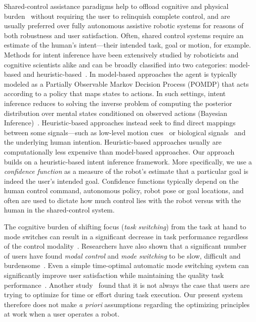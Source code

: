 \documentclass[conference]{IEEEtran}
\begin{document}
Shared-control assistance paradigms help to offload cognitive and physical burden~\cite{volosyak2005rehabilitation} without requiring the user to relinquish complete control, and are usually preferred over fully autonomous assistive robotic systems for reasons of both robustness and user satisfaction. Often, shared control systems require an estimate of the human's intent---their intended task, goal or motion, for example. Methods for intent inference have been extensively studied by roboticists and cognitive scientists alike and can be broadly classified into two categories: model-based and heuristic-based~\cite{baker2017rational}. In model-based approaches the agent is typically modeled as a Partially Observable Markov Decision Process (POMDP) that acts according to a policy that maps states to actions. In such settings, intent inference reduces to solving the inverse problem of computing the posterior distribution over mental states conditioned on observed actions (Bayesian Inference)~\cite{baker2007goal,baker2009action}. Heuristic-based approaches instead seek to find direct mappings between some signals---such as low-level motion cues~\cite{barrett2005accurate} or biological signals~\cite{donoghue2002connecting} and the underlying human intention. Heuristic-based approaches usually are computationally less expensive than model-based approaches. Our approach builds on a heuristic-based intent inference framework. More specifically, we use a \textit{confidence function} as a measure of the robot's estimate that a particular goal is indeed the user's intended goal. Confidence functions typically depend on the human control command, autonomous policy, robot pose or goal locations, and often are used to dictate how much control lies with the robot versus with the human in the shared-control system. 

The cognitive burden of shifting focus (\textit{task switching}) from the task at hand to mode switches can result in a significant decrease in task performance regardless of the control modality~\cite{monsell2003task}. Researchers have also shown that a significant number of users have found \textit{modal control} and \textit{mode switching} to be slow, difficult and burdensome~\cite{herlant2016assistive}. Even a simple time-optimal automatic mode switching system can significantly improve user satisfaction while maintaining the quality task performance~\cite{herlant2016assistive}.  Another study~\cite{gopinath2017human} found that it is not always the case that users are trying to optimize for time or effort during task execution. Our present system therefore does not make \textit{a priori} assumptions regarding the optimizing principles at work when a user operates a robot.
\end{document}
